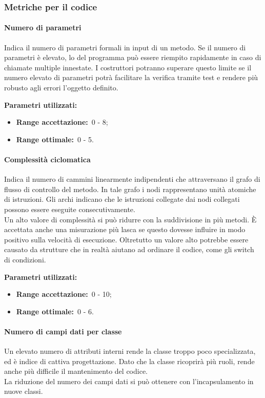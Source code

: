 		\subsubsection{Metriche per il codice}		
		\label{sec:3.7.3}
			\paragraph{Numero di parametri}
			\label{sec:3.7.3.1}
				Indica il numero di parametri formali in input di un metodo. Se il numero di parametri è elevato, lo  del programma può essere riempito rapidamente in caso di chiamate multiple innestate. I costruttori potranno superare questo limite se il numero elevato di parametri potrà facilitare la verifica tramite test e rendere più robusto agli errori l'oggetto definito.
				
				\textbf{Parametri utilizzati:}
				\begin{itemize}
					\item \textbf{Range accettazione:}\ 0 - 8;
					\item \textbf{Range ottimale:}\ 0 - 5.
				\end{itemize}
			\paragraph{Complessità ciclomatica}
			\label{sec:3.7.3.2}
				Indica il numero di cammini linearmente indipendenti che attraversano il grafo di flusso di controllo del metodo. In tale grafo i nodi rappresentano unità atomiche di istruzioni. Gli archi indicano che le istruzioni collegate dai nodi collegati possono essere eseguite consecutivamente. \\
				Un alto valore di complessità si può ridurre con la suddivisione in più metodi. È accettata anche una misurazione più lasca se questo dovesse influire in modo positivo sulla velocità di esecuzione. Oltretutto un valore alto potrebbe essere causato da strutture che in realtà aiutano ad ordinare il codice, come gli switch di condizioni.
				
				\textbf{Parametri utilizzati:}
				\begin{itemize}
					\item \textbf{Range accettazione:}\ 0 - 10;
					\item \textbf{Range ottimale:}\ 0 - 6.
				\end{itemize}
			\paragraph{Numero di campi dati per classe}
			\label{sec:3.7.3.3}
				Un elevato numero di attributi interni rende la classe troppo poco specializzata, ed è indice di cattiva progettazione. Dato che la classe ricoprirà più ruoli, rende anche più difficile il mantenimento del codice. \\
				La riduzione del numero dei campi dati si può ottenere con l'incapsulamento in nuove classi.
				
